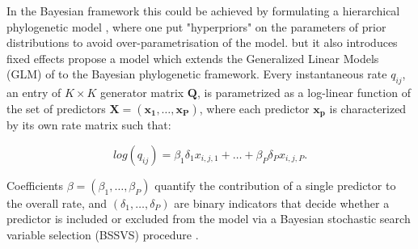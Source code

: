 In the Bayesian framework this could be achieved by formulating a hierarchical phylogenetic model \citep{Edo-Matas2011}, where one put "hyperpriors" on the parameters of prior distributions to avoid over-parametrisation of the model.
but it also introduces fixed effects
\citet{Lemey2014} propose a model which extends the Generalized Linear Models (GLM) of \citet{Nelder1972} to the Bayesian phylogenetic framework.
Every instantaneous rate $q_{ij}$, an entry of $K \times K$ generator matrix $\mathbf{Q}$, is parametrized as a log-linear function of the set of predictors $\mathbf{X}=\left( \mathbf{x_{1}},\ldots,\mathbf{x_{P}}\right)$, where each predictor $\mathbf{x_{p}}$ is characterized by its own rate matrix such that:

\begin{equation}
log(q_{ij})=\beta_{1}\delta_{1}x_{i,j,1}+\ldots+\beta_{P}\delta_{P}x_{i,j,P}.
\label{eq:glm}
\end{equation}

Coefficients $\beta=\left(\beta_{1},\ldots,\beta_{P}\right)$ quantify the contribution of a single predictor to the overall rate, and $\left(\delta_{1},\ldots,\delta_{P}\right)$ are binary indicators that decide whether a predictor is included or excluded from the model via a Bayesian stochastic search variable selection (BSSVS) procedure \citep{Kuo1998,Lemey2009}.

